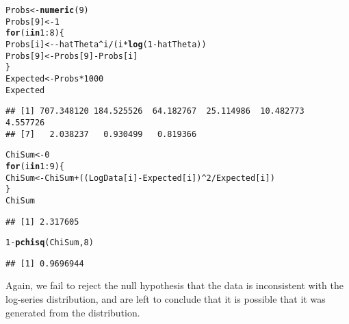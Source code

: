 \documentclass[10pt]{paper}\usepackage[]{graphicx}\usepackage[]{color}
\makeatletter
\newcommand{\hlnum}[1]{\textcolor[rgb]{0.686,0.059,0.569}{#1}}%
\newcommand{\hlopt}[1]{\textcolor[rgb]{0,0,0}{#1}}%
\newcommand{\hlstd}[1]{\textcolor[rgb]{0.345,0.345,0.345}{#1}}%
\newcommand{\hlkwa}[1]{\textcolor[rgb]{0.161,0.373,0.58}{\textbf{#1}}}%
\newcommand{\hlkwb}[1]{\textcolor[rgb]{0.69,0.353,0.396}{#1}}%
\newcommand{\hlkwd}[1]{\textcolor[rgb]{0.737,0.353,0.396}{\textbf{#1}}}%
\newenvironment{kframe}{%
 \def\at@end@of@kframe{}%
 \ifinner\ifhmode%
  \def\at@end@of@kframe{\end{minipage}}%
  \begin{minipage}{\columnwidth}%
 \fi\fi%
 \def\FrameCommand##1{\hskip\@totalleftmargin \hskip-\fboxsep
 \colorbox{shadecolor}{##1}\hskip-\fboxsep
     \hskip-\linewidth \hskip-\@totalleftmargin \hskip\columnwidth}%
 \MakeFramed {\advance\hsize-\width
   \@totalleftmargin\z@ \linewidth\hsize
   \@setminipage}}%
 {\par\unskip\endMakeFramed%
 \at@end@of@kframe}
\newenvironment{knitrout}{}{} %
\makeatother
\begin{document}
\begin{knitrout}
\color{fgcolor}\begin{kframe}
\begin{alltt}
 \hlstd{Probs} \hlkwb{<-} \hlkwd{numeric}\hlstd{(} \hlnum{9} \hlstd{)}
 \hlstd{Probs[}\hlnum{9}\hlstd{]} \hlkwb{<-} \hlnum{1}
 \hlkwa{for}\hlstd{( i} \hlkwa{in} \hlnum{1}\hlopt{:}\hlnum{8}\hlstd{) \{}
     \hlstd{Probs[i]} \hlkwb{<-} \hlopt{-}\hlstd{hatTheta}\hlopt{^}\hlstd{i} \hlopt{/} \hlstd{( i}\hlopt{*}\hlkwd{log}\hlstd{(} \hlnum{1}\hlopt{-} \hlstd{hatTheta))}
     \hlstd{Probs[}\hlnum{9}\hlstd{]} \hlkwb{<-} \hlstd{Probs[}\hlnum{9}\hlstd{]} \hlopt{-} \hlstd{Probs[i]}
 \hlstd{\}}
 \hlstd{Expected} \hlkwb{<-} \hlstd{Probs}\hlopt{*}\hlnum{1000}
 \hlstd{Expected}
\end{alltt}
\begin{verbatim}
## [1] 707.348120 184.525526  64.182767  25.114986  10.482773   4.557726
## [7]   2.038237   0.930499   0.819366
\end{verbatim}
\begin{alltt}
 \hlstd{ChiSum} \hlkwb{<-} \hlnum{0}
 \hlkwa{for}\hlstd{( i} \hlkwa{in} \hlnum{1}\hlopt{:}\hlnum{9} \hlstd{)\{}
     \hlstd{ChiSum} \hlkwb{<-} \hlstd{ChiSum} \hlopt{+} \hlstd{((LogData[i]}\hlopt{-}\hlstd{Expected[i])}\hlopt{^}\hlnum{2} \hlopt{/} \hlstd{Expected[i])}
 \hlstd{\}}
 \hlstd{ChiSum}
\end{alltt}
\begin{verbatim}
## [1] 2.317605
\end{verbatim}
\begin{alltt}
 \hlnum{1}\hlopt{-} \hlkwd{pchisq}\hlstd{(ChiSum,}\hlnum{8}\hlstd{)}
\end{alltt}
\begin{verbatim}
## [1] 0.9696944
\end{verbatim}
\end{kframe}
\end{knitrout}
Again, we fail to reject the null hypothesis that the data is
inconsistent with the log-series distribution, and are left to
conclude that it is possible that it was generated from the distribution.
\end{document}
